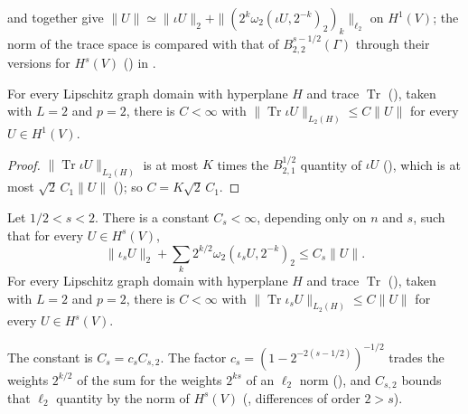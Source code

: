  and  together give
$\|U\| \simeq \|\iota U\|_2 + \|(2^k \omega_2(\iota U, 2^{-k})_2)_k\|_{\ell_2}$ on $H^1(V)$; the
norm of the trace space is compared with that of $B^{s-1/2}_{2,2}(\Gamma)$ through their versions
for $H^s(V)$ () in .

\begin{lemma}
\label{lem:graph-trace-sobolev-one}
\leanok
{}
For every Lipschitz graph domain with hyperplane $H$ and trace $\operatorname{Tr}$
(), taken with $L = 2$ and $p = 2$, there is $C < \infty$ with
$\|\operatorname{Tr} \iota U\|_{L_2(H)} \leq C \|U\|$ for every $U \in H^1(V)$.
\end{lemma}

\begin{proof}
\leanok
$\|\operatorname{Tr} \iota U\|_{L_2(H)}$ is at most $K$ times the $B^{1/2}_{2,1}$ quantity of
$\iota U$ (), which is at most $\sqrt 2 \, C_1 \|U\|$
(); so $C = K \sqrt 2 \, C_1$.
\end{proof}

\begin{lemma}
\label{lem:graph-trace-sobolev}
\leanok
{}
Let $1/2 < s < 2$. There is a constant $C_s < \infty$, depending only on $n$ and $s$, such that
for every $U \in H^s(V)$,
\[
  \|\iota_s U\|_2 + \sum_k 2^{k/2} \omega_2(\iota_s U, 2^{-k})_2 \leq C_s \|U\| .
\]
For every Lipschitz graph domain with hyperplane $H$ and trace $\operatorname{Tr}$
(), taken with $L = 2$ and $p = 2$, there is $C < \infty$ with
$\|\operatorname{Tr} \iota_s U\|_{L_2(H)} \leq C \|U\|$ for every $U \in H^s(V)$.
\end{lemma}

The constant is $C_s = c_s C_{s,2}$. The factor $c_s = (1 - 2^{-2(s - 1/2)})^{-1/2}$ trades the
weights $2^{k/2}$ of the sum for the weights $2^{ks}$ of an $\ell_2$ norm
(), and $C_{s,2}$ bounds that $\ell_2$ quantity by the norm of
$H^s(V)$ (, differences of order $2 > s$).

